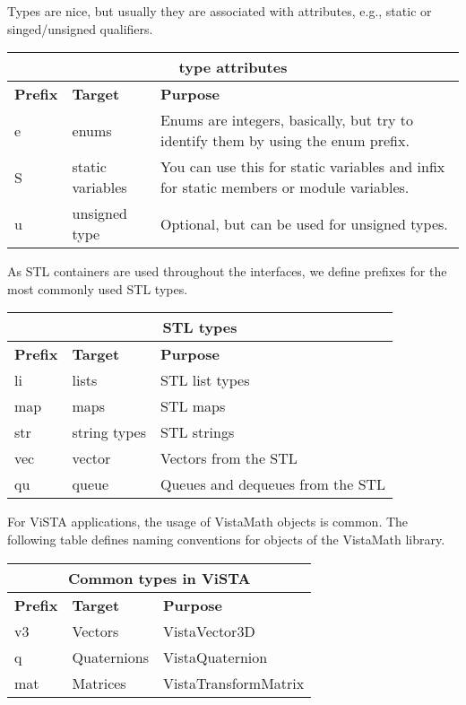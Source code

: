 Types are nice, but usually they are associated with attributes, e.g., static or singed/unsigned qualifiers.

\begin{tabular}{|l|l|p{10cm}|}
\multicolumn{3}{c}{\textbf{type attributes}}\\\hline
\textbf{Prefix} & \textbf{Target} & \textbf{Purpose} \\\hline
e   & enums & Enums are integers, basically, but try to identify them
              by using the enum prefix.\\\hline
S   & static variables & You can use this for static variables and infix for
                       static members or module variables.\\\hline
u   & unsigned type & Optional, but can be used for unsigned types.\\\hline
\end{tabular}

As STL containers are used throughout the interfaces, we define prefixes for the most commonly used STL types.

\begin{tabular}{|l|l|p{10cm}|}
\multicolumn{3}{c}{\textbf{STL types}}\\\hline
\textbf{Prefix} & \textbf{Target} & \textbf{Purpose} \\\hline
li  & lists & STL list types\\\hline
map  & maps  & STL maps\\\hline
str   & string types & STL strings \\\hline
vec  & vector & Vectors from the STL\\\hline
qu   & queue & Queues and dequeues from the STL\\\hline
\end{tabular}


For ViSTA applications, the usage of VistaMath objects is common.
The following table defines naming conventions for objects of the VistaMath library.

\begin{tabular}{|l|l|p{10cm}|}
\multicolumn{3}{c}{\textbf{Common types in ViSTA}}\\\hline
\textbf{Prefix} & \textbf{Target} & \textbf{Purpose} \\\hline
v3  & Vectors &  VistaVector3D\\\hline
q  & Quaternions & VistaQuaternion \\\hline
mat   & Matrices & VistaTransformMatrix\\\hline
\end{tabular}


